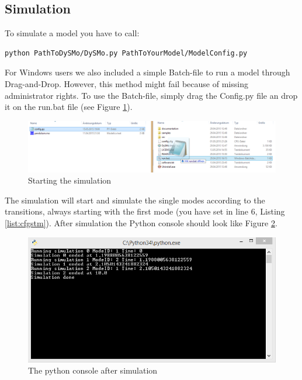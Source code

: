 \subsection{Simulation}

To simulate a model you have to call:
\lstset{language=bash}
\begin{lstlisting}
python PathToDySMo/DySMo.py PathToYourModel/ModelConfig.py
\end{lstlisting}

For Windows users we also included a simple Batch-file to run a model through Drag-and-Drop.
However, this method might fail because of missing administrator rights.
To use the Batch-file, simply drag the Config.py file an drop it on the run.bat file (see Figure \ref{fig:startingsimulation}).

 \begin{figure}[htb]
 \centering
 \includegraphics[width=1.0\textwidth,angle=0]{images/GettingStarted/DragDrop}
 \caption[Starting the simulation]{Starting the simulation}
 \label{fig:startingsimulation}
\end{figure}

The simulation will start and simulate the single modes according to the transitions, always starting with the first mode (you have set in line 6, Listing \ref{list:cfgstm}).
After simulation the Python console should look like Figure \ref{fig:pconsole}.\\

 \begin{figure}[htb]
 \centering
 \includegraphics[width=1.0\textwidth,angle=0]{images/GettingStarted/pythonconsole}
 \caption[The python console after simulation]{The python console after simulation}
 \label{fig:pconsole}
\end{figure}

